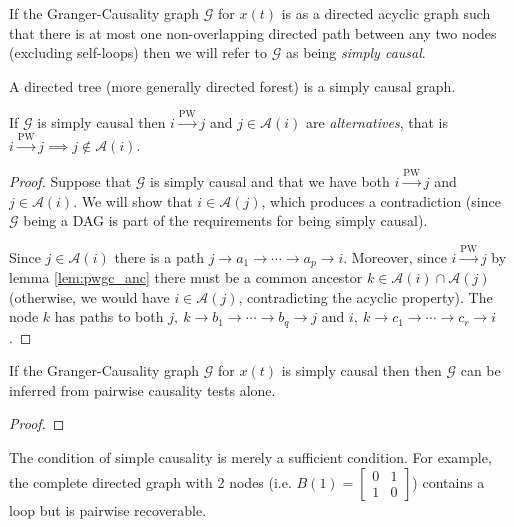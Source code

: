 \documentclass[12pt]{article}
\def\pwgc{\overset{\text{PW}}{\rightarrow}}  %
\def\gcg{\mathcal{G}}  %
\newcommand{\anc}[1]{\mathcal{A}(#1)}  %
\newcommand{\gcgpath}[4]{#1 \rightarrow #2_1 \rightarrow \cdots \rightarrow #2_{#3} \rightarrow #4}
\begin{document}
\begin{definition}
  If the Granger-Causality graph $\gcg$ for $x(t)$ is as a directed
  acyclic graph such that there is at most one non-overlapping
  directed path between any two nodes (excluding self-loops) then we
  will refer to $\gcg$ as being \textit{simply causal}.
\end{definition}

\begin{example}
  A directed tree (more generally directed forest) is a simply causal
  graph.
\end{example}

\begin{lemma}
  If $\gcg$ is simply causal then $i \pwgc j$ and $j \in \anc{i}$ are
  \textit{alternatives}, that is $i \pwgc j \implies j \notin \anc{i}$.
\end{lemma}
\begin{proof}
  Suppose that $\gcg$ is simply causal and that we have both
  $i \pwgc j$ and $j \in \anc{i}$.  We will show that $i \in \anc{j}$,
  which produces a contradiction (since $\gcg$ being a DAG is part of
  the requirements for being simply causal).

  Since $j \in \anc{i}$ there is a path $\gcgpath{j}{a}{p}{i}$.
  Moreover, since $i \pwgc j$ by lemma \ref{lem:pwgc_anc} there must
  be a common ancestor $k \in \anc{i} \cap \anc{j}$ (otherwise, we would
  have $i \in \anc{j}$, contradicting the acyclic property).  The node
  $k$ has paths to both $j,\ \gcgpath{k}{b}{q}{j}$ and $i,\ \gcgpath{k}{c}{r}{i}$.

\end{proof}

\begin{theorem}
  \label{thm:tree_recovery}
  If the Granger-Causality graph $\gcg$ for $x(t)$ is simply causal
  then then $\gcg$ can be inferred from pairwise causality tests
  alone.
\end{theorem}
\begin{proof}
  
\end{proof}

\begin{example}
  The condition of simple causality is merely a sufficient condition.  For example, the complete directed graph with 2 nodes (i.e. $B(1) = \left[ \begin{array}{cc} 0 & 1 \\ 1 & 0 \end{array} \right]$) contains a loop but is pairwise recoverable.
\end{example}
\end{document}
